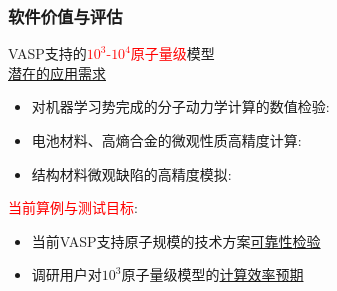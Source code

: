 \frame
{
	\frametitle{软件价值与评估}
\textrm{VASP}支持的\textcolor{red}{$10^3$-$10^4$原子量级}模型\\
\underline{潜在的应用需求}
\begin{itemize}
		\setlength{\itemsep}{10pt}
		\item 	对机器学习势完成的分子动力学计算的数值检验:\\
			{\fontsize{7.2pt}{5.2pt}\selectfont{是否可以彻底摆脱对第一原理大规模计算的约束}}
		\item 电池材料、高熵合金的微观性质高精度计算:\\
			{\fontsize{7.2pt}{5.2pt}\selectfont{高精度的应用级模拟}}
		\item 结构材料微观缺陷的高精度模拟:\\
			{\fontsize{7.2pt}{5.2pt}\selectfont{高精度的材料可观测实验组数据对照}}
	\end{itemize}
	\vskip 5pt
	\textcolor{red}{当前算例与测试目标}:~
	\begin{itemize}
		\item 当前\textrm{VASP}支持原子规模的技术方案\underline{可靠性检验}
		\item 调研用户对$10^3$原子量级模型的\underline{计算效率预期}
	\end{itemize}
}

